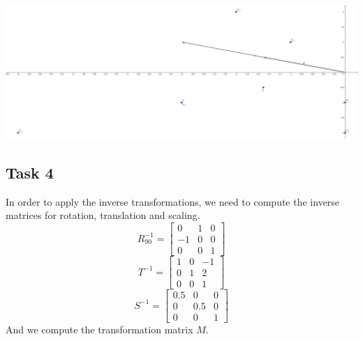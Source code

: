 \documentclass{article}
\begin{document}
\begin{center}
	\includegraphics[width=15cm]{task_3.png}
\end{center}

\subsection{Task 4}
In order to apply the inverse transformations, we need to compute the inverse matrices for rotation, translation and scaling.
\[ R_{90}^{-1} = \begin{bmatrix} 0 & 1 & 0 \\ -1 & 0 & 0 \\ 0 & 0 & 1 \end{bmatrix} \]
\[ T^{-1} = \begin{bmatrix} 1 & 0 & -1 \\ 0 & 1 & 2 \\ 0 & 0 & 1 \end{bmatrix} \]
\[ S^{-1} = \begin{bmatrix} 0.5 & 0 & 0 \\ 0 & 0.5 & 0 \\ 0 & 0 & 1 \end{bmatrix} \]
And we compute the transformation matrix $M$.
\end{document}
